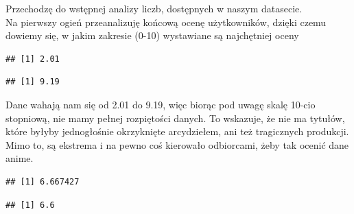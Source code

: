 \documentclass[
]{article}
\newenvironment{Shaded}{\begin{snugshade}}{\end{snugshade}}
\newcommand{\FunctionTok}[1]{\textcolor[rgb]{0.13,0.29,0.53}{\textbf{#1}}}
\newcommand{\NormalTok}[1]{#1}
\newcommand{\SpecialCharTok}[1]{\textcolor[rgb]{0.81,0.36,0.00}{\textbf{#1}}}
\begin{document}
Przechodzę do wstępnej analizy liczb, dostępnych w naszym datasecie.\\
Na pierwszy ogień przeanalizuję końcową ocenę użytkowników, dzięki czemu
dowiemy się, w jakim zakresie (0-10) wystawiane są najchętniej oceny

\begin{Shaded}
\end{Shaded}

\begin{verbatim}
## [1] 2.01
\end{verbatim}

\begin{Shaded}
\end{Shaded}

\begin{verbatim}
## [1] 9.19
\end{verbatim}

Dane wahają nam się od 2.01 do 9.19, więc biorąc pod uwagę skalę 10-cio
stopniową, nie mamy pełnej rozpiętości danych. To wskazuje, że nie ma
tytułów, które byłyby jednogłośnie okrzyknięte arcydziełem, ani też
tragicznych produkcji. Mimo to, są ekstrema i na pewno coś kierowało
odbiorcami, żeby tak ocenić dane anime.

\begin{Shaded}
\end{Shaded}

\begin{verbatim}
## [1] 6.667427
\end{verbatim}

\begin{Shaded}
\end{Shaded}

\begin{verbatim}
## [1] 6.6
\end{verbatim}
\end{document}
